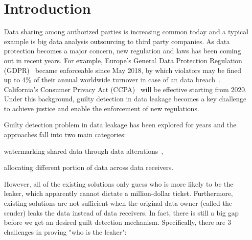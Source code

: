 \section{Introduction}

Data sharing among authorized parties is increasing common today and a typical example is big data analysis outsourcing to third party companies.
As data protection becomes a major concern, new regulation and laws has been coming out in recent years. 
For example, Europe's General Data Protection Regulation (GDPR)~\cite{gdpr} became enforceable since May 2018, by which violators may be fined up to 4\% of their annual worldwide turnover in case of an data breach~\cite{google-fined}.
California's Consumer Privacy Act (CCPA)~\cite{ccpa} will be effective starting from 2020.
Under this background, guilty detection in data leakage becomes a key challenge to achieve justice and enable the enforcement of new regulations.


Guilty detection problem in data leakage has been explored for years and the approaches fall into two main categories: 
\begin{enumerate*} [label=(\roman*)]
	\item watermarking shared data through data alterations~\cite{agrawal2002watermarking},
	\item allocating different portion of data across data receivers\cite{data-leakage-detection}.
\end{enumerate*}

However, all of the existing solutions only guess who is more likely to be the leaker, which apparently cannot dictate a million-dollar ticket.
Furthermore, existing solutions are not sufficient when the original data owner (called the sender) leaks the data instead of data receivers.
In fact, there is still a big gap before we get an desired guilt detection mechanism. 
Specifically, there are 3 challenges in proving "who is the leaker":


